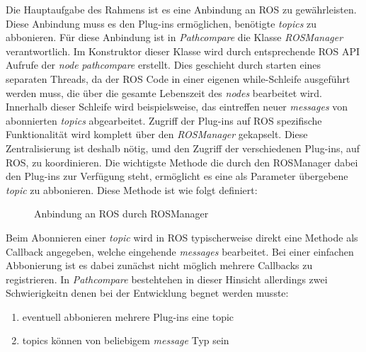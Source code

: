 Die Hauptaufgabe des Rahmens ist es eine Anbindung an ROS zu gewährleisten.
Diese Anbindung muss es den Plug-ins ermöglichen, benötigte \textit{topics} zu
abbonieren. Für diese Anbindung ist in \textit{Pathcompare} die Klasse
\textit{ROSManager} verantwortlich. Im Konstruktor dieser Klasse wird durch
entsprechende \gls{ROS} API Aufrufe der \textit{node} \textit{pathcompare}
erstellt. Dies geschieht durch starten eines separaten Threads, da der ROS Code
in einer eigenen while-Schleife ausgeführt werden muss, die über die gesamte
Lebenszeit des \textit{nodes} bearbeitet wird. Innerhalb dieser Schleife wird
beispielsweise, das eintreffen neuer \textit{messages} von abonnierten
\textit{topics} abgearbeitet.
Zugriff der Plug-ins auf ROS spezifische Funktionalität wird komplett über den
\textit{ROSManager} gekapselt. Diese Zentralisierung ist deshalb nötig, umd den Zugriff
der verschiedenen Plug-ins, auf ROS, zu koordinieren. 
Die wichtigste Methode die durch den ROSManager dabei den Plug-ins zur
Verfügung steht, ermöglicht es eine als Parameter übergebene \textit{topic} zu
abbonieren. 
Diese Methode ist wie folgt definiert:

\begin{figure}[t]
  \begin{center}
  \end{center}
  \caption{Anbindung an ROS durch ROSManager}
  \label{fig:rosmanager}
\end{figure}


Beim Abonnieren einer \textit{topic} wird in ROS typischerweise direkt eine
Methode als Callback angegeben, welche eingehende \textit{messages} bearbeitet.
Bei einer einfachen Abbonierung ist es dabei zunächst nicht möglich mehrere
Callbacks zu registrieren.
In \textit{Pathcompare} bestehtehen in dieser Hinsicht allerdings zwei
Schwierigkeitn denen bei der Entwicklung begnet werden musste:

\begin{enumerate}
  \item eventuell abbonieren mehrere Plug-ins eine topic
  \item topics können von beliebigem \textit{message} Typ sein
\end{enumerate}


